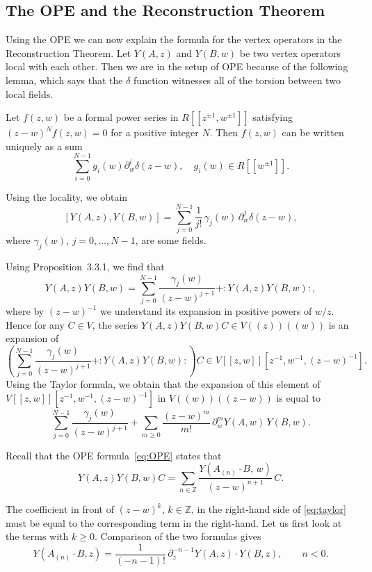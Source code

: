 \documentclass[12pt]{article}
\begin{document}
\subsection{The OPE and the Reconstruction Theorem}
Using the OPE we can now explain the formula for the vertex operators in the Reconstruction Theorem. Let $Y(A,z)$ and $Y(B,w)$ be two vertex operators local with each other.  Then we are in the setup of OPE because of the following lemma, which says that the $\delta$ function witnesses all of the torsion between two local fields.

\begin{lemma}
    Let $f(z,w)$ be a formal power series in $R[[z^{\pm1},w^{\pm1}]]$
satisfying $(z-w)^N f(z,w) = 0$ for a positive integer $N$. Then $f(z,w)$ can be written uniquely as a sum
\[
\sum_{i=0}^{N-1} g_i(w) \partial_w^i \delta(z-w), \quad g_i(w) \in R[[w^{\pm1}]].
\]
\end{lemma}


Using the locality, we obtain
\begin{equation}\label{eq:commutator}
[Y(A,z),Y(B,w)] = \sum_{j=0}^{N-1} \frac{1}{j!}\,\gamma_j(w)\,\partial_w^j\delta(z-w),
\end{equation}
where $\gamma_j(w)$, $j=0,\dots,N-1$, are some fields.  

Using Proposition~3.3.1, we find that
\begin{equation}\label{eq:OPE}
Y(A,z)Y(B,w)
= \sum_{j=0}^{N-1} \frac{\gamma_j(w)}{(z-w)^{j+1}} 
  + :Y(A,z)Y(B,w):,
\end{equation}
where by $(z-w)^{-1}$ we understand its expansion in positive powers of $w/z$.  
Hence for any $C\in V$, the series $Y(A,z)Y(B,w)C\in V((z))((w))$ is an expansion of
\[
\left( \sum_{j=0}^{N-1}\frac{\gamma_j(w)}{(z-w)^{j+1}} + :Y(A,z)Y(B,w): \right) C
\in V[[z,w]][z^{-1},w^{-1},(z-w)^{-1}].
\]
Using the Taylor formula, we obtain that the expansion of this element of
$V[[z,w]][z^{-1},w^{-1},(z-w)^{-1}]$ in $V((w))((z-w))$ is equal to
\begin{equation}\label{eq:taylor}
\sum_{j=0}^{N-1}\frac{\gamma_j(w)}{(z-w)^{j+1}} 
+ \sum_{m\ge0}\frac{(z-w)^m}{m!}\,\partial_w^m Y(A,w)\,Y(B,w).
\end{equation}

Recall that the OPE formula~\eqref{eq:OPE} states that
\[
Y(A,z)Y(B,w)C = \sum_{n\in\mathbb{Z}} \frac{Y(A_{(n)}\cdot B,\,w)}{(z-w)^{n+1}}\,C.
\]

The coefficient in front of $(z-w)^k$, $k\in\mathbb{Z}$, in the right-hand side of \eqref{eq:taylor} must be equal to the corresponding term in the right-hand. 
Let us first look at the terms with $k\ge0$.  
Comparison of the two formulas gives
\begin{equation}\label{eq:Y-action}
Y(A_{(n)}\cdot B, z)
= \frac{1}{(-n-1)!}\,\partial_z^{-n-1}Y(A,z)\cdot Y(B,z),
\qquad n<0.
\end{equation}
\end{document}
